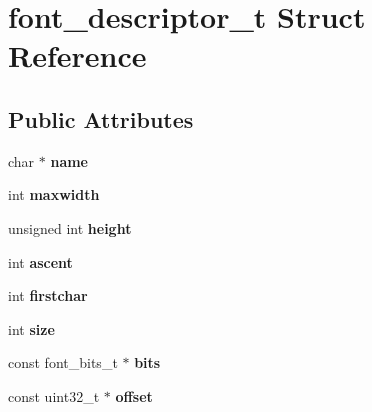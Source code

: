 \hypertarget{structfont__descriptor__t}{}\section{font\+\_\+descriptor\+\_\+t Struct Reference}
\label{structfont__descriptor__t}
\subsection*{Public Attributes}
\begin{DoxyCompactItemize}
\item 
char $\ast$ {\bfseries name}\hypertarget{structfont__descriptor__t_a7a5f7569c87f8995fe45b207897a0327}{}\label{structfont__descriptor__t_a7a5f7569c87f8995fe45b207897a0327}

\item 
int {\bfseries maxwidth}\hypertarget{structfont__descriptor__t_a8e21a73982523c96f1ca5f39487956a7}{}\label{structfont__descriptor__t_a8e21a73982523c96f1ca5f39487956a7}

\item 
unsigned int {\bfseries height}\hypertarget{structfont__descriptor__t_abf7d9548e4312aa8ab0b6c868c5c4ae3}{}\label{structfont__descriptor__t_abf7d9548e4312aa8ab0b6c868c5c4ae3}

\item 
int {\bfseries ascent}\hypertarget{structfont__descriptor__t_af23bcc2d3e1633f8153cb92df31de704}{}\label{structfont__descriptor__t_af23bcc2d3e1633f8153cb92df31de704}

\item 
int {\bfseries firstchar}\hypertarget{structfont__descriptor__t_a9d7d7a8a663625f6fb6120cb9dc0d970}{}\label{structfont__descriptor__t_a9d7d7a8a663625f6fb6120cb9dc0d970}

\item 
int {\bfseries size}\hypertarget{structfont__descriptor__t_abe0724754ffd1eefe3933c49c534eb8a}{}\label{structfont__descriptor__t_abe0724754ffd1eefe3933c49c534eb8a}

\item 
const font\+\_\+bits\+\_\+t $\ast$ {\bfseries bits}\hypertarget{structfont__descriptor__t_a8d9fbb0fd97c708b08e7f6fe5c866fab}{}\label{structfont__descriptor__t_a8d9fbb0fd97c708b08e7f6fe5c866fab}

\item 
const uint32\+\_\+t $\ast$ {\bfseries offset}\hypertarget{structfont__descriptor__t_aaf4c05aa205048a217620ca26f8c5abb}{}\label{structfont__descriptor__t_aaf4c05aa205048a217620ca26f8c5abb}


\end{DoxyCompactItemize}
